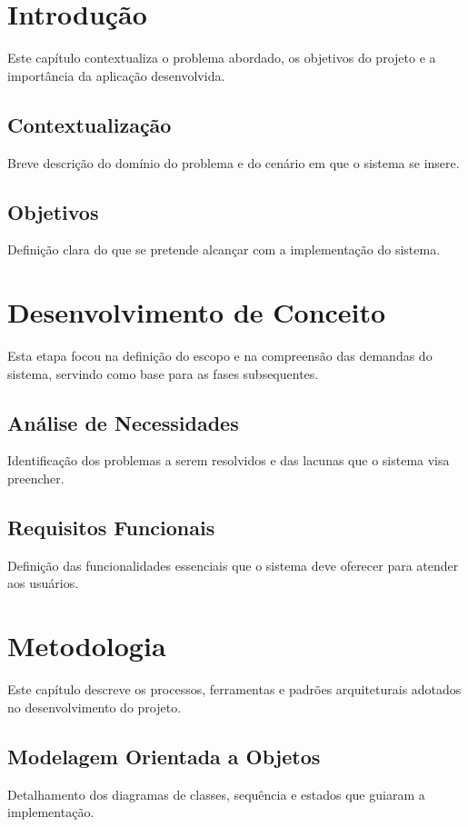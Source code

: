 \section{Introdução}
\label{sec:introducao}
Este capítulo contextualiza o problema abordado, os objetivos do projeto e a importância da aplicação desenvolvida.

\subsection{Contextualização}
\label{subsec:contextualizacao}
Breve descrição do domínio do problema e do cenário em que o sistema se insere.

\subsection{Objetivos}
\label{subsec:objetivos}
Definição clara do que se pretende alcançar com a implementação do sistema.

\section{Desenvolvimento de Conceito}
\label{sec:conceito}
Esta etapa focou na definição do escopo e na compreensão das demandas do sistema, servindo como base para as fases subsequentes.

\subsection{Análise de Necessidades}
Identificação dos problemas a serem resolvidos e das lacunas que o sistema visa preencher.

\subsection{Requisitos Funcionais}
Definição das funcionalidades essenciais que o sistema deve oferecer para atender aos usuários.

\section{Metodologia}
\label{sec:metodologia}
Este capítulo descreve os processos, ferramentas e padrões arquiteturais adotados no desenvolvimento do projeto.

\subsection{Modelagem Orientada a Objetos}
\label{subsec:modelagem}
Detalhamento dos diagramas de classes, sequência e estados que guiaram a implementação.

